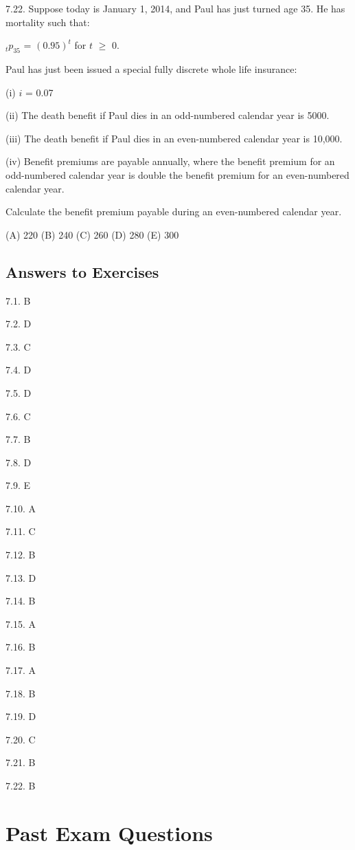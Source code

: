 \documentclass[]{book}
\begin{document}
7.22. Suppose today is January 1, 2014, and Paul has just turned age 35.
He has mortality such that:

\({}_{t}p_{35}\) = \((0.95)^t\) for \(t\) \(\ge\) 0.

Paul has just been issued a special fully discrete whole life insurance:

(i) \(i\) = 0.07

(ii) The death benefit if Paul dies in an odd-numbered calendar year is
5000.

(iii) The death benefit if Paul dies in an even-numbered calendar year
is 10,000.

(iv) Benefit premiums are payable annually, where the benefit premium
for an odd-numbered calendar year is double the benefit premium for an
even-numbered calendar year.

Calculate the benefit premium payable during an even-numbered calendar
year.

(A) 220 (B) 240 (C) 260 (D) 280 (E) 300

\subsection{Answers to Exercises}\label{answers-to-exercises-4}

7.1. B

7.2. D

7.3. C

7.4. D

7.5. D

7.6. C

7.7. B

7.8. D

7.9. E

7.10. A

7.11. C

7.12. B

7.13. D

7.14. B

7.15. A

7.16. B

7.17. A

7.18. B

7.19. D

7.20. C

7.21. B

7.22. B

\section{Past Exam Questions}\label{past-exam-questions-4}
\end{document}
